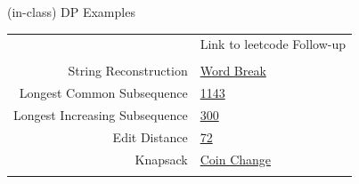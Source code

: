 \documentclass[10pt,a4paper]{article}
\begin{document}
\begin{multicols}{3}
\begin{textbox}{(in-class) DP Examples }
    \begin{tabular}{r|p{}}\scriptsize
        & Link to leetcode Follow-up  \\
        & \\
        String Reconstruction & \href{https://leetcode.com/problems/word-break/}{Word Break} \\
        Longest Common Subsequence & \href{https://leetcode.com/problems/longest-common-subsequence/}{1143}\\
        Longest Increasing Subsequence & \href{https://leetcode.com/problems/longest-increasing-subsequence/}{300}\\
        Edit Distance & \href{https://leetcode.com/problems/edit-distance/}{72} \\
        Knapsack & \href{https://leetcode.com/problems/coin-change/}{Coin Change} \\\\
    \end{tabular}
\end{textbox}


\end{multicols}
\end{document}
